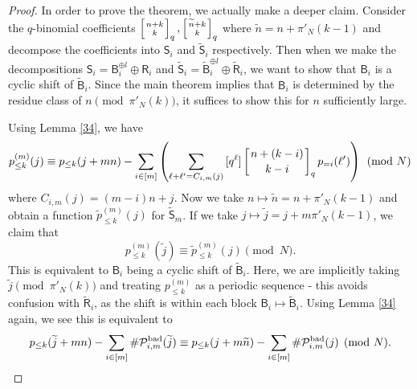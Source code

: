 \documentclass[12pt]{article}
\newcommand{\qbinom}[2]{\left[{#1 \atop #2}\right]_q}
\begin{document}
\begin{proof}
In order to prove the theorem, we actually make a deeper claim. Consider the $q$-binomial coefficients $\qbinom{n+k}{k}, \qbinom{\widetilde{n}+k}{k}$ where $\widetilde{n} = n+\pi'_N(k-1)$ and decompose the coefficients into $\mathsf{S}_i$ and $\widetilde{\mathsf{S}}_i$ respectively. Then when we make the decompositions $\mathsf{S}_i = \mathsf{B}_i^{\oplus l} \oplus \mathsf{R}_i$ and $\widetilde{\mathsf{S}}_i = \widetilde{\mathsf{B}}_i^{\oplus l} \oplus \widetilde{\mathsf{R}}_i$, we want to show that $\mathsf{B}_i$ is a cyclic shift of $\widetilde{\mathsf{B}}_i$. Since the main theorem implies that $\mathsf{B}_i$ is determined by the residue class of $n \pmod{\pi'_N(k)}$, it suffices to show this for $n$ sufficiently large.

Using Lemma \ref{34}, we have 
\[p_{\le k}^{(m)}(j) \equiv p_{\le k}(j+mn)-\sum_{i\in[m]}\left({\sum_{\ell+\ell' = C_{i,m}(j)}{[q^\ell]\qbinom{n+(k-i)}{k-i}p_{=i}(\ell')}}\right) \pmod{N}\]
where $C_{i,m}(j) = (m-i)n+j$. Now we take $n \mapsto \widetilde{n}=n+\pi'_N(k-1)$ and obtain a function $\widetilde{p}_{\le k}^{(m)}(j)$ for $\widetilde{\mathsf{S}}_m$. If we take $j \mapsto \widetilde{j}=j+m\pi'_N(k-1)$, we claim that
\[p_{\le k}^{(m)}(\widetilde{j}) \equiv  \widetilde{p}^{(m)}_{\le k}(j) \pmod{N}.\]
This is equivalent to $\mathsf{B}_i$ being a cyclic shift of $\widetilde{\mathsf{B}}_i$. Here, we are implicitly taking $\tilde{j} \pmod{\pi'_N(k)}$ and treating $p_{\le k}^{(m)}$ as a periodic sequence - this avoids confusion with $\widetilde{\mathsf{R}}_i$, as the shift is within each block $\mathsf{B}_i \mapsto \widetilde{\mathsf{B}}_i$. Using Lemma \ref{34} again, we see this is equivalent to
\[p_{\le k}(\widetilde{j}+mn)-\sum_{i\in[m]}{\#\mathcal{P}^{\textup{bad}}_{i,m}(\widetilde{j})} \equiv p_{\le k}(j+m\widetilde{n})-\sum_{i\in[m]}{\#\mathcal{P}^{\textup{bad}}_{i,m}(j)} \pmod{N}.\]


\end{proof}
\end{document}
